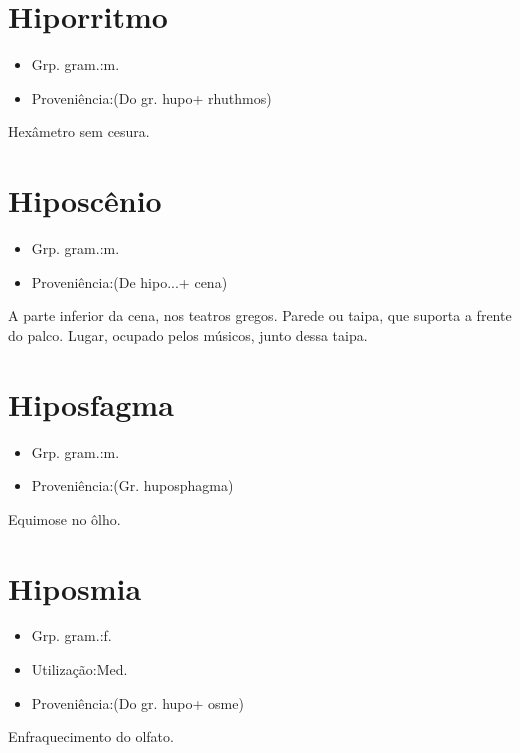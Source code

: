 \documentclass{article}
\begin{document}
\section{Hiporritmo}
\begin{itemize}
\item {Grp. gram.:m.}
\end{itemize}
\begin{itemize}
\item {Proveniência:(Do gr. \textunderscore hupo\textunderscore  + \textunderscore rhuthmos\textunderscore )}
\end{itemize}
Hexâmetro sem cesura.
\section{Hiposcênio}
\begin{itemize}
\item {Grp. gram.:m.}
\end{itemize}
\begin{itemize}
\item {Proveniência:(De \textunderscore hipo...\textunderscore  + \textunderscore cena\textunderscore )}
\end{itemize}
A parte inferior da cena, nos teatros gregos.
Parede ou taipa, que suporta a frente do palco.
Lugar, ocupado pelos músicos, junto dessa taipa.
\section{Hiposfagma}
\begin{itemize}
\item {Grp. gram.:m.}
\end{itemize}
\begin{itemize}
\item {Proveniência:(Gr. \textunderscore huposphagma\textunderscore )}
\end{itemize}
Equimose no ôlho.
\section{Hiposmia}
\begin{itemize}
\item {Grp. gram.:f.}
\end{itemize}
\begin{itemize}
\item {Utilização:Med.}
\end{itemize}
\begin{itemize}
\item {Proveniência:(Do gr. \textunderscore hupo\textunderscore  + \textunderscore osme\textunderscore )}
\end{itemize}
Enfraquecimento do olfato.
\end{document}
